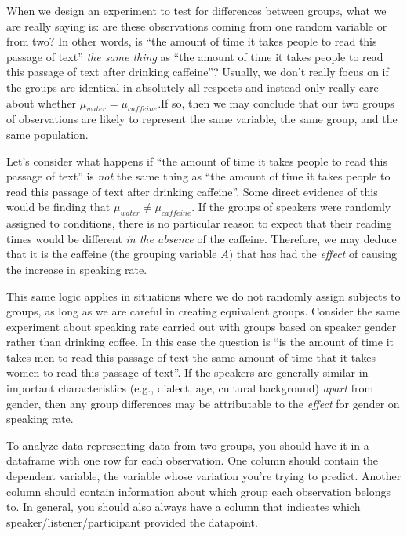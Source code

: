 \documentclass[
]{book}
\begin{document}
When we design an experiment to test for differences between groups, what we are really saying is: are these observations coming from one random variable or from two? In other words, is ``the amount of time it takes people to read this passage of text'' \emph{the same thing} as ``the amount of time it takes people to read this passage of text after drinking caffeine''? Usually, we don't really focus on if the groups are identical in absolutely all respects and instead only really care about whether \(\mu_{water} = \mu_{caffeine}\).If so, then we may conclude that our two groups of observations are likely to represent the same variable, the same group, and the same population.

Let's consider what happens if ``the amount of time it takes people to read this passage of text'' is \emph{not} the same thing as ``the amount of time it takes people to read this passage of text after drinking caffeine''. Some direct evidence of this would be finding that \(\mu_{water} ≠ \mu_{caffeine}\). If the groups of speakers were randomly assigned to conditions, there is no particular reason to expect that their reading times would be different \emph{in the absence} of the caffeine. Therefore, we may deduce that it is the caffeine (the grouping variable \(A\)) that has had the \emph{effect} of causing the increase in speaking rate.

This same logic applies in situations where we do not randomly assign subjects to groups, as long as we are careful in creating equivalent groups. Consider the same experiment about speaking rate carried out with groups based on speaker gender rather than drinking coffee. In this case the question is ``is the amount of time it takes men to read this passage of text the same amount of time that it takes women to read this passage of text''. If the speakers are generally similar in important characteristics (e.g., dialect, age, cultural background) \emph{apart} from gender, then any group differences may be attributable to the \emph{effect} for gender on speaking rate.

To analyze data representing data from two groups, you should have it in a dataframe with one row for each observation. One column should contain the dependent variable, the variable whose variation you're trying to predict. Another column should contain information about which group each observation belongs to. In general, you should also always have a column that indicates which speaker/listener/participant provided the datapoint.
\end{document}
